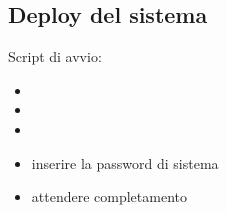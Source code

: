 \subsection{Deploy del sistema}

Script di avvio:
\begin{itemize}
   \item {}
   \item {}
   \item {}
   \item inserire la password di sistema
   \item attendere completamento
\end{itemize}